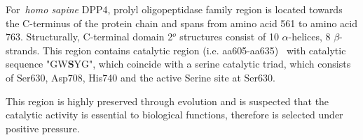 For~\textit{homo sapine} DPP4, prolyl oligopeptidase family region is located towards the C-terminus of the protein chain and spans from amino acid 561 to amino acid 763. Structurally, C-terminal domain 2$^{o}$ structures consist of 10 $\alpha$-helices, 8 $\beta$-strands. This region contains catalytic region (i.e. aa605-aa635)~\cite{Rawlings1991,Barrett1992,Polgár1992,Rawlings1994} with catalytic sequence "GW\textbf{S}YG", which coincide with  a serine catalytic triad, which consists of Ser630, Asp708, His740 and the active Serine site at Ser630. \par
This region is highly preserved through evolution and is suspected that the catalytic activity is essential to biological functions, therefore is selected under positive pressure. 